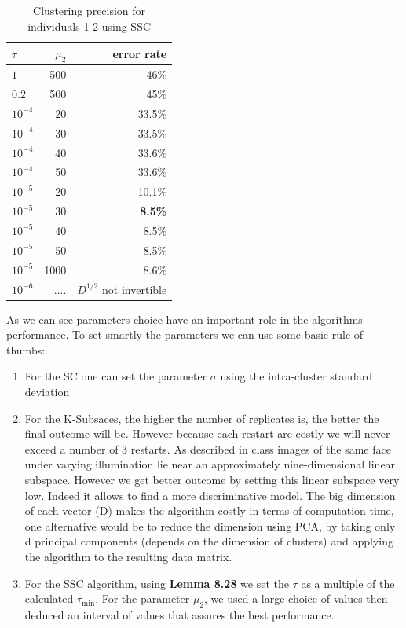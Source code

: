 \documentclass[12pt,a4paper,onecolumn]{article}
\begin{document}
\begin{table}[H]
	\centering
	\begin{tabular}{l|r|r}
		\toprule
		{}    \(\tau\) & \(\mu_2\) & error rate               \\
		\midrule

		\(1   \)       & 500       & 46\%                     \\
		\(0.2 \)       & 500       & 45\%                     \\
		\(10^{-4}\)    & 20        & 33.5\%                   \\
		\(10^{-4}\)    & 30        & 33.5\%                   \\
		\(10^{-4}\)    & 40        & 33.6\%                   \\
		\(10^{-4}\)    & 50        & 33.6\%                   \\
		\(10^{-5}\)    & 20        & 10.1\%                   \\
		\(10^{-5}\)    & 30        & \textbf{8.5\%}           \\
		\(10^{-5}\)    & 40        & 8.5\%                    \\
		\(10^{-5}\)    & 50        & 8.5\%                    \\
		\(10^{-5}\)    & 1000      & 8.6\%                    \\
		\(10^{-6}\)    & ....      & $D^{1/2}$ not invertible \\
		\bottomrule
	\end{tabular}
	\caption{Clustering precision for individuals 1-2 using SSC}
\end{table}

As we can see parameters choice have an important role in the algorithms performance.
To set smartly the parameters we can use some basic rule of thumbs:
\begin{enumerate}
	\item For the SC one can set the parameter $\sigma$ using the intra-cluster standard deviation
	\item For the K-Subsaces, the higher the number of replicates is, the better the final outcome will be. However because each restart are costly we will never exceed a number of 3 restarts. As described in class images of the same face under varying illumination lie near an approximately nine-dimensional linear subspace. However we get better outcome by setting this linear subspace very low. Indeed it allows to find a more discriminative model.
	      The big dimension of each vector (D) makes the algorithm costly in terms of computation time, one alternative would be to reduce the dimension using PCA, by taking only d principal components (depends on the dimension of clusters)  and applying the algorithm to the resulting data matrix.

	\item For the SSC algorithm, using \textbf{Lemma 8.28} we set the $\tau$ as a multiple of the calculated $\tau_{\text{min}}$. For the parameter $\mu_2$, we used a large choice of values then deduced an interval of values that assures the best performance.
\end{enumerate}
\end{document}
